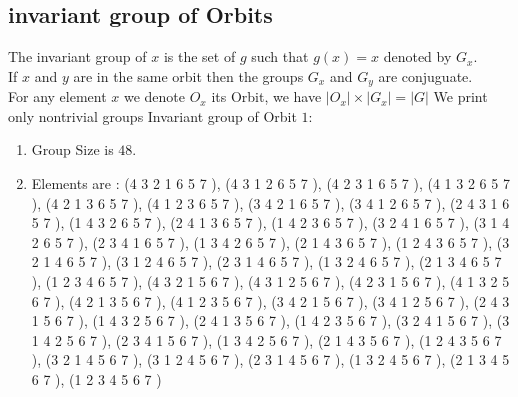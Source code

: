 \documentclass[12pt]{article}
\begin{document}
\subsection{invariant group of Orbits}
\noindent The invariant group of $x$ is the set of $g$ such that $g(x)=x$ denoted by $G_x$.\\
If $x$ and $y$ are in the same orbit then the groups $G_x$ and  $G_y$ are conjuguate.\\
For any element $x$ we denote $O_x$ its Orbit, we have $|O_x|\times |G_x|=|G|$
We print only nontrivial groups
Invariant group of Orbit $1$:
\begin{enumerate}
\item Group Size is $48$.
\item Elements are : (4 3 2 1 6 5 7  ), (4 3 1 2 6 5 7  ), (4 2 3 1 6 5 7  ), (4 1 3 2 6 5 7  ), (4 2 1 3 6 5 7  ), (4 1 2 3 6 5 7  ), (3 4 2 1 6 5 7  ), (3 4 1 2 6 5 7  ), (2 4 3 1 6 5 7  ), (1 4 3 2 6 5 7  ), (2 4 1 3 6 5 7  ), (1 4 2 3 6 5 7  ), (3 2 4 1 6 5 7  ), (3 1 4 2 6 5 7  ), (2 3 4 1 6 5 7  ), (1 3 4 2 6 5 7  ), (2 1 4 3 6 5 7  ), (1 2 4 3 6 5 7  ), (3 2 1 4 6 5 7  ), (3 1 2 4 6 5 7  ), (2 3 1 4 6 5 7  ), (1 3 2 4 6 5 7  ), (2 1 3 4 6 5 7  ), (1 2 3 4 6 5 7  ), (4 3 2 1 5 6 7  ), (4 3 1 2 5 6 7  ), (4 2 3 1 5 6 7  ), (4 1 3 2 5 6 7  ), (4 2 1 3 5 6 7  ), (4 1 2 3 5 6 7  ), (3 4 2 1 5 6 7  ), (3 4 1 2 5 6 7  ), (2 4 3 1 5 6 7  ), (1 4 3 2 5 6 7  ), (2 4 1 3 5 6 7  ), (1 4 2 3 5 6 7  ), (3 2 4 1 5 6 7  ), (3 1 4 2 5 6 7  ), (2 3 4 1 5 6 7  ), (1 3 4 2 5 6 7  ), (2 1 4 3 5 6 7  ), (1 2 4 3 5 6 7  ), (3 2 1 4 5 6 7  ), (3 1 2 4 5 6 7  ), (2 3 1 4 5 6 7  ), (1 3 2 4 5 6 7  ), (2 1 3 4 5 6 7  ), (1 2 3 4 5 6 7  )
\end{enumerate}
\end{document}
